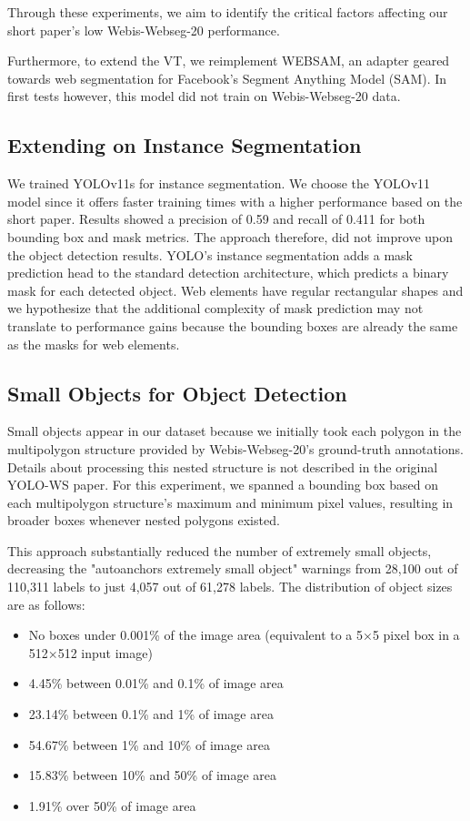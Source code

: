 \documentclass{article}  %
\begin{document}
Through these experiments, we aim to identify the critical factors affecting our short paper's low Webis-Webseg-20 performance.

Furthermore, to extend the VT, we reimplement WEBSAM, an adapter geared towards web segmentation for Facebook's Segment Anything Model (SAM). In first tests however, this model did not train on Webis-Webseg-20 data.

\subsection{Extending on Instance Segmentation}

We trained YOLOv11s for instance segmentation. We choose the YOLOv11 model since it offers faster training times with a higher performance based on the short paper. Results showed a precision of 0.59 and recall of 0.411 for both bounding box and mask metrics. The approach therefore, did not improve upon the object detection results. YOLO's instance segmentation adds a mask prediction head to the standard detection architecture, which predicts a binary mask for each detected object. Web elements have regular rectangular shapes and we hypothesize that the additional complexity of mask prediction may not translate to performance gains because the bounding boxes are already the same as the masks for web elements.

\subsection{Small Objects for Object Detection}
Small objects appear in our dataset because we initially took each polygon in the multipolygon structure provided by Webis-Webseg-20's ground-truth annotations.  Details about processing this nested structure is not described in the original YOLO-WS paper. For this experiment, we spanned a bounding box based on each multipolygon structure's maximum and minimum pixel values, resulting in broader boxes whenever nested polygons existed.

This approach substantially reduced the number of extremely small objects, decreasing the "autoanchors extremely small object" warnings from 28,100 out of 110,311 labels to just 4,057 out of 61,278 labels. The distribution of object sizes are as follows: 
\begin{itemize}
\item No boxes under 0.001\% of the image area (equivalent to a 5×5 pixel box in a 512×512 input image)
\item 4.45\% between 0.01\% and 0.1\% of image area
\item 23.14\% between 0.1\% and 1\% of image area
\item 54.67\% between 1\% and 10\% of image area
\item 15.83\% between 10\% and 50\% of image area
\item 1.91\% over 50\% of image area
\end{itemize}
\end{document}
